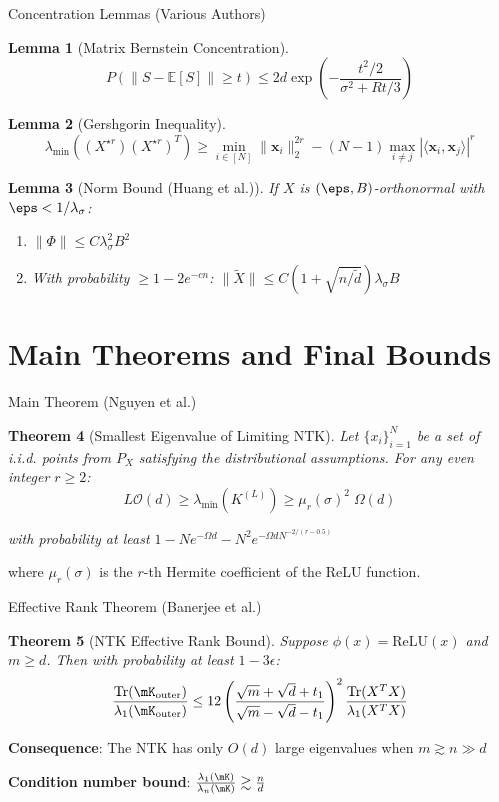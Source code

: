 \documentclass{beamer}
\newtheorem{theorem}{Theorem}[section]
\newtheorem{lemma}[theorem]{Lemma}
\newcommand{\E}{\mathbb{E}}
\newcommand{\evmin}[1]{\lambda_{\min}\left(#1\right)}
\newcommand{\x}{\mathbf{x}}
\newcommand{\bigOmg}{\Omega}
\begin{document}
\begin{frame}{Concentration Lemmas (Various Authors)}
  \begin{lemma}[Matrix Bernstein Concentration]
  $$P(\|S - \E[S]\| \geq t) \leq 2d \exp\left(-\frac{t^2/2}{\sigma^2 + Rt/3}\right)$$
  \end{lemma}
  
  \begin{lemma}[Gershgorin Inequality]
  $$\evmin{(X^{\star r})(X^{\star r})^T} \geq \min_{i \in [N]} \|\x_i\|_2^{2r} - (N-1) \max_{i \neq j} |\langle \x_i, \x_j \rangle|^r$$
  \end{lemma}
  
  \begin{lemma}[Norm Bound (Huang et al.)]
  If $X$ is $(\eps,B)$-orthonormal with $\eps<1/\lambda_\sigma$:
  \begin{enumerate}
    \item $\|\Phi\| \leq C\lambda_\sigma^2 B^2$
    \item With probability $\geq 1-2e^{-cn}$: $\|\tilde{X}\| \leq C(1+\sqrt{n/\tilde{d}})\lambda_\sigma B$
  \end{enumerate}
  \end{lemma}
\end{frame}

\section{Main Theorems and Final Bounds}

\begin{frame}{Main Theorem (Nguyen et al.)}
  \begin{theorem}[Smallest Eigenvalue of Limiting NTK]
  Let $\{x_i\}_{i=1}^{N}$ be a set of i.i.d. points from $P_X$ satisfying the distributional assumptions. For any even integer $r\ge 2$:
  $$L\mathcal{O}(d) \geq \evmin{K^{(L)}} \geq \mu_r(\sigma)^2\; \bigOmg(d)$$
  
  with probability at least $1 - Ne^{-\bigOmg{d}} - N^2e^{-\bigOmg{dN^{-2/(r-0.5)}}}$
  \end{theorem}
  
  where $\mu_r(\sigma)$ is the $r$-th Hermite coefficient of the ReLU function.
\end{frame}

\begin{frame}{Effective Rank Theorem (Banerjee et al.)}
  \begin{theorem}[NTK Effective Rank Bound]
  Suppose $\phi(x) = \text{ReLU}(x)$ and $m \geq d$. Then with probability at least $1 - 3\epsilon$:
  $$\frac{\text{Tr}(\mK_{\text{outer}})}{\lambda_1(\mK_{\text{outer}})} \leq 12 \left(\frac{\sqrt{m} + \sqrt{d} + t_1}{\sqrt{m} - \sqrt{d} - t_1}\right)^2 \frac{\text{Tr}(X^T X)}{\lambda_1(X^T X)}$$
  \end{theorem}
  
  \textbf{Consequence}: The NTK has only $O(d)$ large eigenvalues when $m \gtrsim n \gg d$
  
  \textbf{Condition number bound}: $\frac{\lambda_1(\mK)}{\lambda_n(\mK)} \gtrsim \frac{n}{d}$
\end{frame}
\end{document}
